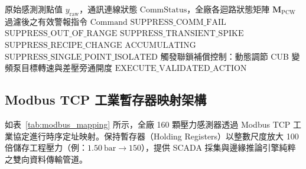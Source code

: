 \documentclass[fontset=none, a4paper, 12pt]{ctexart}
\begin{document}
\begin{doublespace}
\begin{algorithm}[H]
\caption{七層工業級硬化防誤報與跨樓層聯鎖調度演算法 (7L-IH-AC)}
\label{alg:7l_ih}
\begin{algorithmic}[1]
\Require 原始感測測點值 $y_{\mathrm{raw}}$，通訊連線狀態 $\mathrm{CommStatus}$，全廠各迴路狀態矩陣 $\mathbf{M}_{\mathrm{PCW}}$
\Ensure 過濾後之有效警報指令 $\mathrm{Command}$
 
    \State \Return $\mathrm{SUPPRESS\_COMM\_FAIL}$
\EndIf
{} 
    \State \Return $\mathrm{SUPPRESS\_OUT\_OF\_RANGE}$
\EndIf
{} 
    \State \Return $\mathrm{SUPPRESS\_TRANSIENT\_SPIKE}$
\EndIf
{} 
    \State \Return $\mathrm{SUPPRESS\_RECIPE\_CHANGE}$
\EndIf
{} 
    \State \Return $\mathrm{ACCUMULATING}$
\EndIf
{} 
    \State \Return $\mathrm{SUPPRESS\_SINGLE\_POINT\_ISOLATED}$
\EndIf
\State 觸發聯鎖補償控制：動態調節 CUB 變頻泵目標轉速與差壓旁通開度 
\State \Return $\mathrm{EXECUTE\_VALIDATED\_ACTION}$
\end{algorithmic}
\end{algorithm}

\subsection{Modbus TCP 工業暫存器映射架構}
如表~\ref{tab:modbus_mapping} 所示，全廠 160 顆壓力感測器透過 Modbus TCP 工業協定進行時序定址映射。保持暫存器（Holding Registers）以整數尺度放大 100 倍儲存工程壓力（例：$1.50\ \mathrm{bar} \to 150$），提供 SCADA 採集與邊緣推論引擎純粹之雙向資料傳輸管道。


\end{doublespace}
\end{document}
